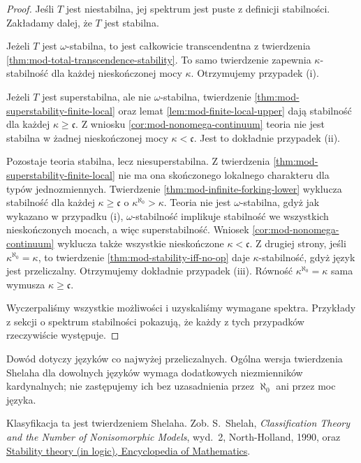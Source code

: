\begin{proof}
Jeśli $T$ jest niestabilna, jej spektrum
jest puste z definicji stabilności.
Zakładamy dalej, że $T$ jest stabilna.

Jeżeli $T$ jest $\omega$-stabilna, to jest
całkowicie transcendentna z twierdzenia
\ref{thm:mod-total-transcendence-stability}.
To samo twierdzenie zapewnia
$\kappa$-stabilność dla każdej
nieskończonej mocy $\kappa$.
Otrzymujemy przypadek (i).

Jeżeli $T$ jest superstabilna, ale nie
$\omega$-stabilna, twierdzenie
\ref{thm:mod-superstability-finite-local}
oraz lemat \ref{lem:mod-finite-local-upper}
dają stabilność dla każdej
$\kappa\geq\mathfrak c$.
Z wniosku \ref{cor:mod-nonomega-continuum}
teoria nie jest stabilna w żadnej
nieskończonej mocy $\kappa<\mathfrak c$.
Jest to dokładnie przypadek (ii).

Pozostaje teoria stabilna,
lecz niesuperstabilna.
Z twierdzenia
\ref{thm:mod-superstability-finite-local}
nie ma ona skończonego lokalnego
charakteru dla typów jednozmiennych.
Twierdzenie
\ref{thm:mod-infinite-forking-lower}
wyklucza stabilność dla każdej
$\kappa\geq\mathfrak c$
o $\kappa^{\aleph_0}>\kappa$.
Teoria nie jest $\omega$-stabilna,
gdyż jak wykazano w przypadku (i),
$\omega$-stabilność implikuje
stabilność we wszystkich nieskończonych
mocach, a więc superstabilność.
Wniosek \ref{cor:mod-nonomega-continuum}
wyklucza także wszystkie nieskończone
$\kappa<\mathfrak c$.
Z drugiej strony, jeśli
$\kappa^{\aleph_0}=\kappa$,
to twierdzenie \ref{thm:mod-stability-iff-no-op}
daje $\kappa$-stabilność,
gdyż język jest przeliczalny.
Otrzymujemy dokładnie przypadek (iii).
Równość $\kappa^{\aleph_0}=\kappa$
sama wymusza $\kappa\geq\mathfrak c$.

Wyczerpaliśmy wszystkie możliwości
i uzyskaliśmy wymagane spektra.
Przykłady z sekcji o spektrum stabilności
pokazują, że każdy z tych przypadków
rzeczywiście występuje.
\end{proof}

Dowód dotyczy języków co najwyżej
przeliczalnych. Ogólna wersja twierdzenia
Shelaha dla dowolnych języków wymaga
dodatkowych niezmienników kardynalnych;
nie zastępujemy ich bez uzasadnienia
przez $\aleph_0$ ani przez moc języka.

Klasyfikacja ta jest twierdzeniem Shelaha.
Zob. S.~Shelah, \emph{Classification Theory and
the Number of Nonisomorphic Models}, wyd.~2,
North-Holland, 1990, oraz
\href{https://encyclopediaofmath.org/wiki/Stability_theory_(in_logic)}
{Stability theory (in logic), Encyclopedia of Mathematics}.

